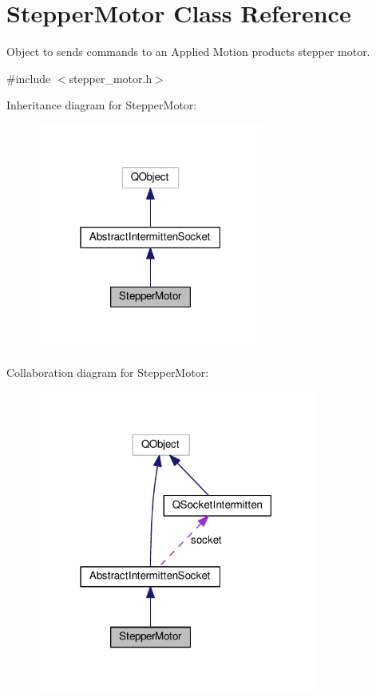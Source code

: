 \hypertarget{class_stepper_motor}{}\section{Stepper\+Motor Class Reference}
\label{class_stepper_motor}


Object to sends commands to an Applied Motion products stepper motor.  




{\ttfamily \#include $<$stepper\+\_\+motor.\+h$>$}



Inheritance diagram for Stepper\+Motor\+:\nopagebreak
\begin{figure}[H]
\begin{center}
\leavevmode
\includegraphics[width=211pt]{class_stepper_motor__inherit__graph}
\end{center}
\end{figure}


Collaboration diagram for Stepper\+Motor\+:\nopagebreak
\begin{figure}[H]
\begin{center}
\leavevmode
\includegraphics[width=259pt]{class_stepper_motor__coll__graph}
\end{center}
\end{figure}
